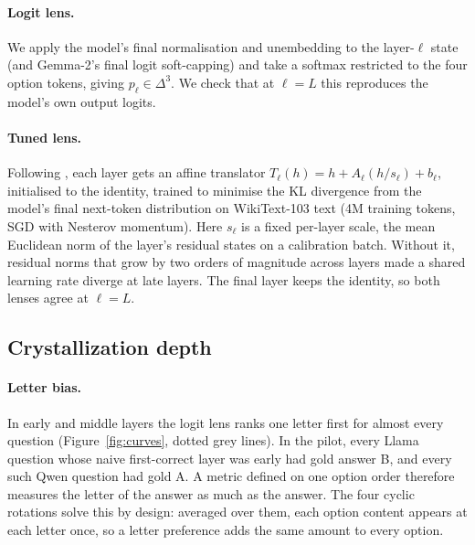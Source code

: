 \paragraph{Logit lens.}
We apply the model's final normalisation and unembedding to the layer-$\ell$ state (and Gemma-2's final logit soft-capping) and take a softmax restricted to the four option tokens, giving $p_\ell \in \Delta^3$.
We check that at $\ell = L$ this reproduces the model's own output logits.

\paragraph{Tuned lens.}
Following \citet{belrose2023tuned}, each layer gets an affine translator $T_\ell(h) = h + A_\ell (h / s_\ell) + b_\ell$, initialised to the identity, trained to minimise the KL divergence from the model's final next-token distribution on WikiText-103 \citep{merity2016pointer} text (4M training tokens, SGD with Nesterov momentum).
Here $s_\ell$ is a fixed per-layer scale, the mean Euclidean norm of the layer's residual states on a calibration batch.
Without it, residual norms that grow by two orders of magnitude across layers made a shared learning rate diverge at late layers.
The final layer keeps the identity, so both lenses agree at $\ell = L$.

\subsection{Crystallization depth}

\paragraph{Letter bias.}
In early and middle layers the logit lens ranks one letter first for almost every question (Figure~\ref{fig:curves}, dotted grey lines).
In the pilot, every Llama question whose naive first-correct layer was early had gold answer B, and every such Qwen question had gold A.
A metric defined on one option order therefore measures the letter of the answer as much as the answer.
The four cyclic rotations solve this by design: averaged over them, each option content appears at each letter once, so a letter preference adds the same amount to every option.

